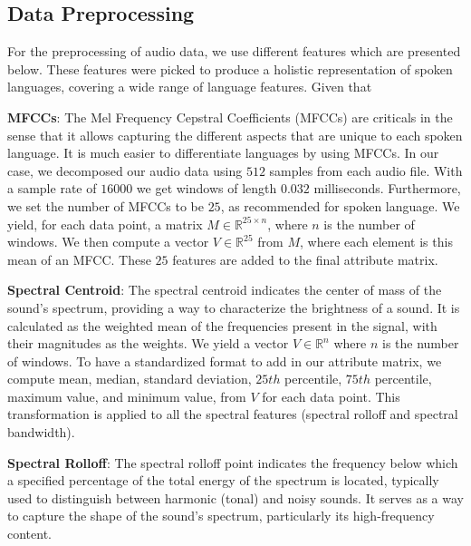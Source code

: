 \documentclass[twocolumn]{article}
\newcommand{\R}{\mathbb{R}}
\begin{document}
\subsection{Data Preprocessing}
For the preprocessing of audio data, we use different features which are presented below. These features were picked to produce a holistic representation of spoken languages, covering a wide range of language features. Given that 

\textbf{MFCCs}:
The Mel Frequency Cepstral Coefficients (MFCCs) are criticals in the sense that it allows capturing the different aspects that are unique to each spoken language. It is much easier to differentiate languages by using MFCCs. In our case, we decomposed our audio data using $512$ samples from each audio file. With a sample rate of $16000$ we get windows of length $0.032$ milliseconds. Furthermore, we set the number of MFCCs to be $25$, as recommended for spoken language. We yield, for each data point, a matrix $M \in \R^{25 \times n}$, where $n$ is the number of windows. We then compute a vector $V \in \R^{25}$ from $M$, where each element is this mean of an MFCC. These $25$ features are added to the final attribute matrix. 

\textbf{Spectral Centroid}: The spectral centroid indicates the center of mass of the sound's spectrum, providing a way to characterize the brightness of a sound. It is calculated as the weighted mean of the frequencies present in the signal, with their magnitudes as the weights. We yield a vector $V \in \R^{n}$ where $n$ is the number of windows. To have a standardized format to add in our attribute matrix, we compute mean, median, standard deviation, $25th$ percentile, $75th$ percentile, maximum value, and minimum value, from $V$ for each data point. This transformation is applied to all the spectral features (spectral rolloff and spectral bandwidth). 

\textbf{Spectral Rolloff}: The spectral rolloff point indicates the frequency below which a specified percentage of the total energy of the spectrum is located, typically used to distinguish between harmonic (tonal) and noisy sounds. It serves as a way to capture the shape of the sound's spectrum, particularly its high-frequency content.
\end{document}
